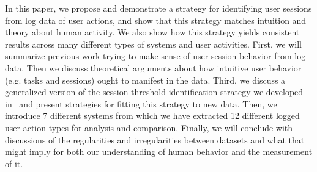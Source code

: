 In this paper, we propose and demonstrate a strategy for identifying user sessions from log data of user actions, and show that this strategy matches intuition and theory about human activity.  We also show how this strategy yields consistent results across many different types of systems and user activities.  First, we will summarize previous work trying to make sense of user session behavior from log data.  Then we discuss theoretical arguments about how intuitive user behavior (e.g. tasks and sessions) ought to manifest in the data.  Third, we discuss a generalized version of the session threshold identification strategy we developed in~\cite{geiger2013using} and present strategies for fitting this strategy to new data.  Then, we introduce 7 different systems from which we have extracted 12 different logged user action types for analysis and comparison. Finally, we will conclude with discussions of the regularities and irregularities between datasets and what that might imply for both our understanding of human behavior and the measurement of it.
